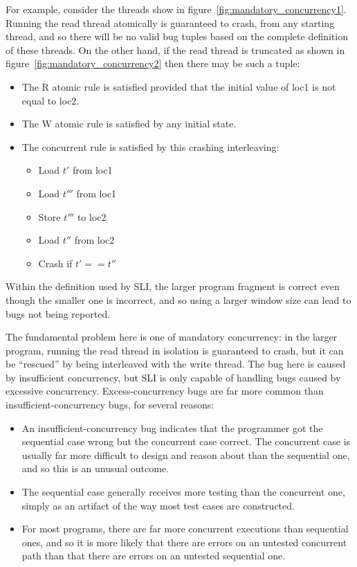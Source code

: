 For example, consider the threads show in figure~\ref{fig:mandatory_concurrency1}.
Running the read thread atomically is guaranteed to crash, from any starting thread, and so there will be no valid bug tuples based on the complete definition of these threads.
On the other hand, if the read thread is truncated as shown in figure~\ref{fig:mandatory_concurrency2} then there may be such a tuple:

\begin{itemize}
\item The R atomic rule is satisfied provided that the initial value of loc1 is not equal to loc2.
\item The W atomic rule is satisfied by any initial state.
\item The concurrent rule is satisfied by this crashing interleaving:
  \begin{itemize}
  \item Load $t'$ from loc1
  \item Load $t'''$ from loc1
  \item Store $t'''$ to loc2
  \item Load $t''$ from loc2
  \item Crash if $t' == t''$
  \end{itemize}
\end{itemize}

Within the definition used by SLI, the larger program fragment is correct even though the smaller one is incorrect, and so using a larger window size can lead to bugs not being reported.

The fundamental problem here is one of mandatory concurrency: in the larger program, running the read thread in isolation is guaranteed to crash, but it can be ``rescued'' by being interleaved with the write thread.
The bug here is caused by insufficient concurrency, but SLI is only capable of handling bugs caused by excessive concurrency.
Excess-concurrency bugs are far more common than insufficient-concurrency bugs, for several reasons:

\begin{itemize}
\item
  An insufficient-concurrency bug indicates that the programmer got the sequential case wrong but the concurrent case correct.
  The concurrent case is usually far more difficult to design and reason about than the sequential one, and so this is an unusual outcome\needCite{}.
\item
  The sequential case generally receives more testing than the concurrent one, simply as an artifact of the way most test cases are constructed\needCite{}.
\item
  For most programs, there are far more concurrent executions than sequential ones, and so it is more likely that there are errors on an untested concurrent path than that there are errors on an untested sequential one.
\end{itemize}

